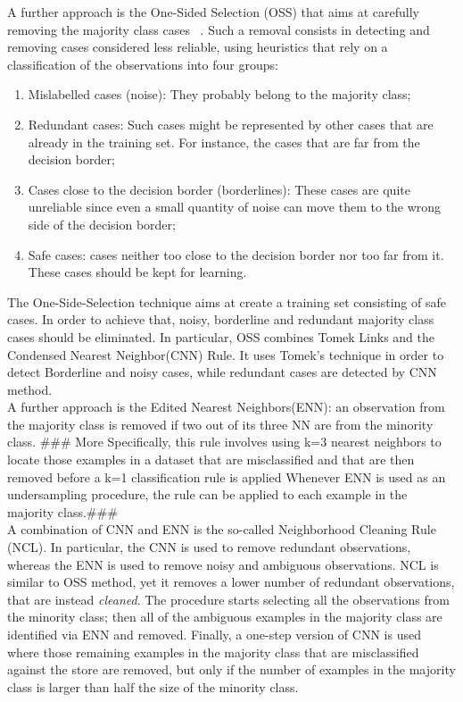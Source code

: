 A further approach is the One-Sided Selection (OSS) that aims at carefully removing the majority class cases ~\cite{batista2000applying}.
Such a removal consists in detecting and removing cases considered less reliable, using heuristics that rely on a classification of the observations into four groups:
\begin{enumerate}
    \item{Mislabelled cases (noise): They probably belong to the majority class;}
    \item{Redundant cases: Such cases might be represented by other cases that are already in the training set. For instance, the cases that are far from the decision border;}
    \item{Cases close to the decision border (borderlines): These cases are quite unreliable since even a small quantity of noise can move them to the wrong side of the decision border;}
    \item{Safe cases: cases  neither too close to the decision border nor  too far from it. These cases should be kept for learning.}
\end{enumerate}
The One-Side-Selection technique aims at create a training set consisting of safe cases. In order to achieve that, noisy, borderline and redundant majority class cases should be eliminated. In particular, OSS  combines Tomek Links and the Condensed Nearest Neighbor(CNN) Rule. It uses Tomek's technique in order to  detect Borderline and noisy cases, while redundant cases are detected by CNN method.\\
\noindent
A further approach is the Edited Nearest Neighbors(ENN):
an observation from the majority class is removed if two out of its three NN are from the minority class. ### More Specifically, this rule involves using k=3 nearest neighbors to locate those examples in a dataset that are misclassified and that are then removed before a k=1 classification rule is applied
Whenever ENN is used as an undersampling procedure, the rule can be applied to each example in the majority class.###\\

A combination of CNN and ENN is the so-called Neighborhood Cleaning Rule (NCL). In particular, the CNN is used to remove redundant observations, whereas the ENN is used to remove noisy and ambiguous observations. NCL is similar to OSS method, yet it removes a lower number of redundant observations, that are instead {\em cleaned}.
The procedure starts selecting all the observations  from the minority class; then all of the ambiguous examples in the majority class are identified via ENN and removed. Finally, a one-step version of CNN is used where those remaining examples in the majority class that are misclassified against the store are removed, but only if the number of examples in the majority class is larger than half the size of the minority class.

